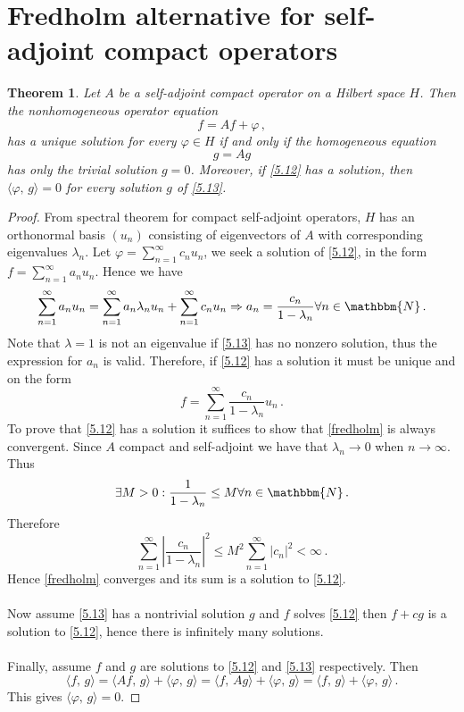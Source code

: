 \documentclass[12pt, a4paper]{article}
\newcommand{\N}{\ensuremath{\mathbbm{N}}}
\newtheorem{theorem}{Theorem}[section]
\begin{document}
\section{Fredholm alternative for self-adjoint compact operators}
\begin{theorem}
Let $A$ be a self-adjoint compact operator on a Hilbert space $H$. Then the nonhomogeneous operator equation
\begin{equation}
    f=Af+\varphi\,,
\label{5.12}
\end{equation}
has a unique solution for every $\varphi\in H$ if and only if the homogeneous equation
\begin{equation}
g=Ag
\label{5.13}
\end{equation}
has only the trivial solution $g=0$. Moreover, if \eqref{5.12} has a solution, then $\langle\varphi,\,g\rangle=0$ for every solution $g$ of \eqref{5.13}.
\end{theorem}
\begin{proof}
From spectral theorem for compact self-adjoint operators, $H$ has an orthonormal basis $(u_n)$ consisting of eigenvectors of $A$ with corresponding eigenvalues $\lambda_n$. Let $\varphi=\sum_{n=1}^\infty c_n u_n $, we seek a solution of \eqref{5.12}, in the form $f=\sum_{n=1}^\infty a_nu_n$. Hence we have
\[
    \sum_{n=1}^\infty a_nu_n=\sum_{n=1}^\infty a_n\lambda_nu_n+\sum_{n=1}^\infty c_nu_n\Rightarrow a_n=\dfrac{c_n}{1-\lambda_n}\forall n\in\N\,.
\]
Note that $\lambda=1$ is not an eigenvalue if \eqref{5.13} has no nonzero solution, thus the expression for $a_n$ is valid. Therefore, if \eqref{5.12} has a solution it must be unique and on the form
\begin{equation}
f=\sum_{n=1}^\infty \dfrac{c_n}{1-\lambda_n}u_n\,.
\label{fredholm}
\end{equation}
To prove that \eqref{5.12} has a solution it suffices to show that \eqref{fredholm} is always convergent. Since $A$ compact and self-adjoint we have that $\lambda_n\to 0$ when $n\to\infty$. Thus
\[
    \exists M>0:\dfrac{1}{1-\lambda_n}\leq M\forall n\in\N\,.
\]
Therefore
\[
    \sum_{n=1}^\infty\left|\dfrac{c_n}{1-\lambda_n}\right|^2\leq M^2\sum_{n=1}^\infty |c_n|^2<\infty\,.
\]
Hence \eqref{fredholm} converges and its sum is a solution to \eqref{5.12}.
\\\\
Now assume \eqref{5.13} has a nontrivial solution $g$ and $f$ solves \eqref{5.12} then $f+cg$ is a solution to \eqref{5.12}, hence there is infinitely many solutions.
\\\\
Finally, assume $f$ and $g$ are solutions to \eqref{5.12} and \eqref{5.13} respectively. Then
\[
    \langle f,\,g\rangle=\langle Af,\,g\rangle+\langle\varphi,\,g\rangle=\langle f,\,Ag\rangle +\langle\varphi,\,g\rangle=\langle f,\,g\rangle+\langle\varphi,\,g\rangle\,.
\]
This gives $\langle\varphi,\,g\rangle=0$.
\end{proof}
\end{document}
